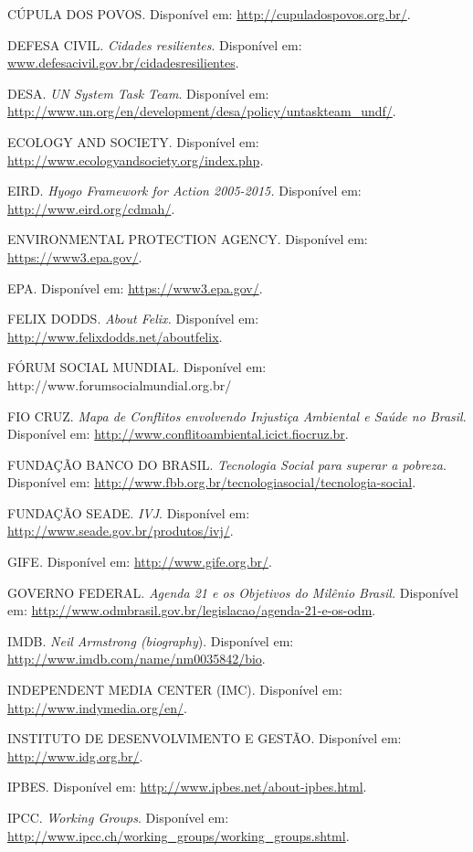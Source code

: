 CÚPULA DOS POVOS. Disponível em: \url{http://cupuladospovos.org.br/}.

DEFESA CIVIL. \emph{Cidades resilientes}. Disponível em:
\href{http://www.defesacivil.gov.br/cidadesresilientes}{www.defesacivil.gov.br/cidadesresilientes}.

DESA. \emph{UN System Task Team}. Disponível em:
\url{http://www.un.org/en/development/desa/policy/untaskteam_undf/}.

ECOLOGY AND SOCIETY. Disponível em:
\url{http://www.ecologyandsociety.org/index.php}\emph{.}

EIRD. \emph{Hyogo Framework for Action 2005-2015.} Disponível em:
\url{http://www.eird.org/cdmah/}.

ENVIRONMENTAL PROTECTION AGENCY. Disponível em:
\url{https://www3.epa.gov/}.

EPA. Disponível em: \url{https://www3.epa.gov/}.

FELIX DODDS. \emph{About Felix.} Disponível em:
\href{http://www.felixdodds.net/aboutfelix}{{http://www.felixdodds.net/aboutfelix}}.

FÓRUM SOCIAL MUNDIAL. Disponível em:
{http://www.forumsocialmundial.org.br/}

FIO CRUZ. \emph{Mapa de Conflitos envolvendo Injustiça Ambiental e Saúde
no Brasil}. Disponível em:
\url{http://www.conflitoambiental.icict.fiocruz.br}.

FUNDAÇÃO BANCO DO BRASIL. \emph{Tecnologia Social para superar a
pobreza}. Disponível em:
\url{http://www.fbb.org.br/tecnologiasocial/tecnologia-social}.

FUNDAÇÃO SEADE. \emph{IVJ}. Disponível em:
\url{http://www.seade.gov.br/produtos/ivj/}.

GIFE\emph{.} Disponível em: \url{http://www.gife.org.br/}.

GOVERNO FEDERAL. \emph{Agenda 21 e os Objetivos do Milênio Brasil.}
Disponível em:
\url{http://www.odmbrasil.gov.br/legislacao/agenda-21-e-os-odm}.

IMDB. \emph{Neil Armstrong (biography}). Disponível em:
\url{http://www.imdb.com/name/nm0035842/bio}.

INDEPENDENT MEDIA CENTER (IMC). Disponível em:
\url{http://www.indymedia.org/en/}.

INSTITUTO DE DESENVOLVIMENTO E GESTÃO. Disponível em:
\url{http://www.idg.org.br/}.

IPBES. Disponível em: \url{http://www.ipbes.net/about-ipbes.html}.

IPCC. \emph{Working Groups}. Disponível em:
\url{http://www.ipcc.ch/working_groups/working_groups.shtml}.

